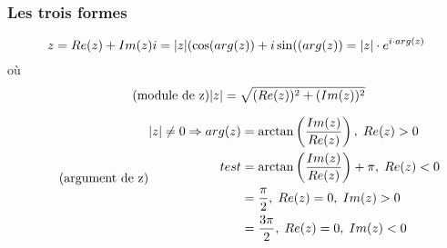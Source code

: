 \documentclass[10pt,a4paper]{book}
\DeclarePairedDelimiter\abs{\lvert}{\rvert}
\begin{document}
\subsubsection{Les trois formes}

\begin{equation*}
z = Re(z) + Im(z)i = \abs{z}(\cos(arg(z)) + i\sin((arg(z)) = \abs{z}\cdot e^{i\cdot arg(z)}
\end{equation*}
où
\begin{equation*} \tag{module de z}
\abs{z} = \sqrt{(Re(z))^2 + (Im(z))^2} 
\end{equation*}

\begin{equation*} \tag{argument de z}
\begin{split}
\abs{z} \neq 0 \Rightarrow arg(z) &= \arctan\left(\frac{Im(z)}{Re(z)}\right), \; Re(z)>0 \\
test &= \arctan\left(\frac{Im(z)}{Re(z)}\right)+\pi,\; Re(z) < 0 \\
&= \frac{\pi}{2},\; Re(z) = 0,\; Im(z) > 0 \\
&= \frac{3\pi}{2},\; Re(z) = 0,\; Im(z) < 0
\end{split}
\end{equation*}
\end{document}
